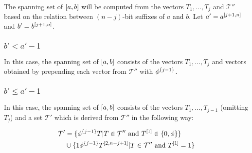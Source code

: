 The spanning set of $[a, b]$ will be computed
from the vectors $T_1, \ldots, T_j$ and $\mathcal{T}''$
based on the relation between $(n-j)$-bit suffixes of $a$
and $b$.
Let $a' = a^{[j+1, n]}$ and $b' = b^{[j+1, n]}$.

\subsubsection{\texorpdfstring
{$b' < a' - 1$}
{b' < a' - 1}
}

In this case,
the spanning set of $[a, b]$ consists
of the vectors $T_1, \ldots, T_j$ and vectors obtained
by prepending each vector from $\mathcal{T}''$ with
$\phi^{\{j-1\}}$.

\subsubsection{\texorpdfstring
{$b' \leq a' - 1$}
{b' >= a' - 1}
}

In this case,
the spanning set of $[a, b]$ consists
of the vectors $T_1, \ldots, T_{j-1}$ (omitting $T_j$)
and a set $\mathcal{T}'$ which is derived
from $\mathcal{T}''$
in the following way:

\begin{align*}
\mathcal{T}' &= \{
\phi^{\{j-1\}} T | T \in \mathcal{T}'' \text{ and }
T^{[1]} \in \{0, \phi\}
\} \\
&\cup \{
1 \phi^{\{j-1\}} T^{[2, n-j+1]} | T \in \mathcal{T}''
\text{ and } T^{[1]} = 1
\}
\end{align*}

